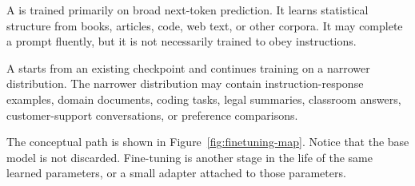 A  is trained primarily on broad next-token prediction. It learns statistical structure from books, articles, code, web text, or other corpora. It may complete a prompt fluently, but it is not necessarily trained to obey instructions.

A  starts from an existing checkpoint and continues training on a narrower distribution. The narrower distribution may contain instruction-response examples, domain documents, coding tasks, legal summaries, classroom answers, customer-support conversations, or preference comparisons.

The conceptual path is shown in Figure~\ref{fig:finetuning-map}. Notice that the base model is not discarded. Fine-tuning is another stage in the life of the same learned parameters, or a small adapter attached to those parameters.


